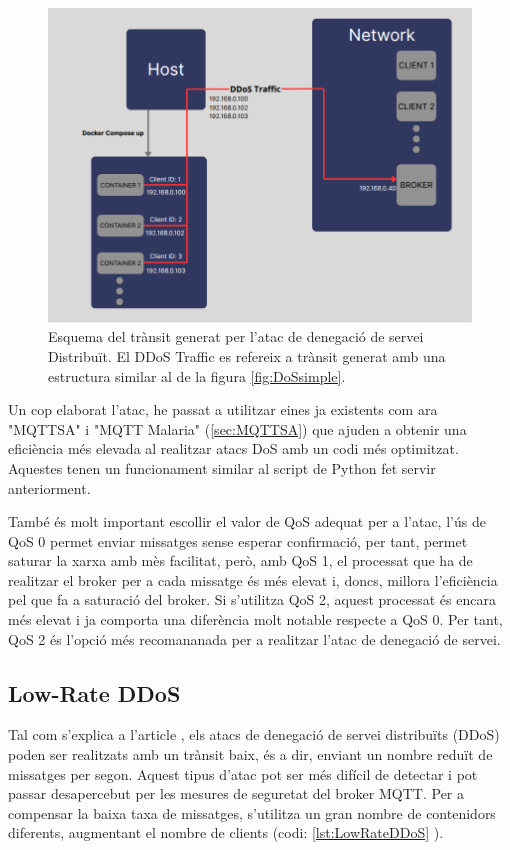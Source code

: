   \begin{figure}[H]
    \centering
    \includegraphics[width=1\textwidth]{img/DDoS.png}
    \caption{Esquema del trànsit generat per l'atac de denegació de servei Distribuït. El DDoS Traffic es refereix a trànsit generat amb una estructura similar al de la figura \ref{fig:DoSsimple}.}
    \label{fig:DDoS}
  \end{figure}

Un cop elaborat l'atac, he passat a utilitzar eines ja existents com ara "MQTTSA" i "MQTT Malaria" (\ref{sec:MQTTSA}) que ajuden a obtenir una eficiència més elevada al realitzar atacs DoS amb un codi més optimitzat. Aquestes tenen un funcionament similar al script de Python fet servir anteriorment.

També és molt important escollir el valor de QoS adequat per a l'atac, l'ús de QoS 0 permet enviar missatges sense esperar confirmació, per tant, permet saturar la xarxa amb mès facilitat, però, amb QoS 1, el processat que ha de realitzar el broker per a cada missatge és més elevat i, doncs, millora l'eficiència pel que fa a saturació del broker. Si s'utilitza QoS 2, aquest processat és encara més elevat i ja comporta una diferència molt notable respecte a QoS 0. Per tant, QoS 2 és l'opció més recomananada per a realitzar l'atac de denegació de servei. 

\subsection{Low-Rate DDoS}

Tal com s'explica a l'article \cite{lowrateDDoSexp}, els atacs de denegació de servei distribuïts (DDoS) poden ser realitzats amb un trànsit baix, és a dir, enviant un nombre reduït de missatges per segon. Aquest tipus d'atac pot ser més difícil de detectar i pot passar desapercebut per les mesures de seguretat del broker MQTT. Per a compensar la baixa taxa de missatges, s'utilitza un gran nombre de contenidors diferents, augmentant el nombre de clients (codi: \ref{lst:LowRateDDoS} ).